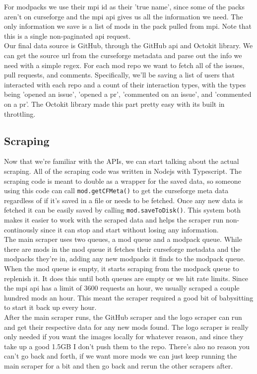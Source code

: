 \documentclass[a4paper,12pt, twocolumn]{article}
\begin{document}
For modpacks we use their mpi id as their 'true name', since some of the packs aren't on curseforge and the mpi api gives us all the information we need. The only information we save is a list of mods in the pack pulled from mpi. Note that this is a single non-paginated api request.\\

Our final data source is GitHub, through the GitHub api and Octokit library. We can get the source url from the curseforge metadata and parse out the info we need with a simple regex. For each mod repo we want to fetch all of the issues, pull requests, and comments. Specifically, we'll be saving a list of users that interacted with each repo and a count of their interaction types, with the types being 'opened an issue', 'opened a pr', 'commented on an issue', and 'commented on a pr'. The Octokit library made this part pretty easy with its built in throttling.

\subsection{Scraping}

Now that we're familiar with the APIs, we can start talking about the actual scraping. All of the scraping code was written in Nodejs with Typescript. The scraping code is meant to double as a wrapper for the saved data, so someone using this code can call \verb|mod.getCFMeta()| to get the curseforge meta data regardless of if it's saved in a file or needs to be fetched. Once any new data is fetched it can be easily saved by calling \verb|mod.saveToDisk()|. This system both makes it easier to work with the scraped data and helps the scraper run non-continously since it can stop and start without losing any information.\\

The main scraper uses two queues, a mod queue and a modpack queue. While there are mods in the mod queue it fetches their curseforge metadata and the modpacks they're in, adding any new modpacks it finds to the modpack queue. When the mod queue is empty, it starts scraping from the modpack queue to replenish it. It does this until both queues are empty or we hit rate limits. Since the mpi api has a limit of 3600 requests an hour, we usually scraped a couple hundred mods an hour. This meant the scraper required a good bit of babysitting to start it back up every hour.\\

After the main scraper runs, the GitHub scraper and the logo scraper can run and get their respective data for any new mods found. The logo scraper is really only needed if you want the images locally for whatever reason, and since they take up a good 1.5GB I don't push them to the repo. There's also no reason you can't go back and forth, if we want more mods we can just keep running the main scraper for a bit and then go back and rerun the other scrapers after.
\end{document}
